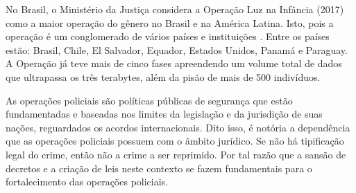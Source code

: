 
No Brasil, o Ministério da Justiça considera a Operação Luz na Infância (2017) como a maior operação do gênero no Brasil e na América Latina. Isto, pois a operação é um conglomerado de vários países e instituições \cite{souza2018sabemos}. Entre os países estão: Brasil, Chile, El Salvador, Equador, Estados Unidos, Panamá e Paraguay. A Operação já teve mais de cinco fases apreendendo um volume total de dados que ultrapassa os três terabytes, além da pisão de mais de 500 indivíduos. 


As operações policiais são políticas públicas de segurança que estão fundamentadas e baseadas nos limites da legislação e da jurisdição de suas nações, reguardados os acordos internacionais. Dito isso, é notória a dependência que as operações policiais possuem com o âmbito jurídico. Se não há tipificação legal do crime, então não a crime a ser reprimido. Por tal razão que a sansão de decretos e a criação de leis neste contexto se fazem fundamentais para o fortalecimento das operações policiais. 


